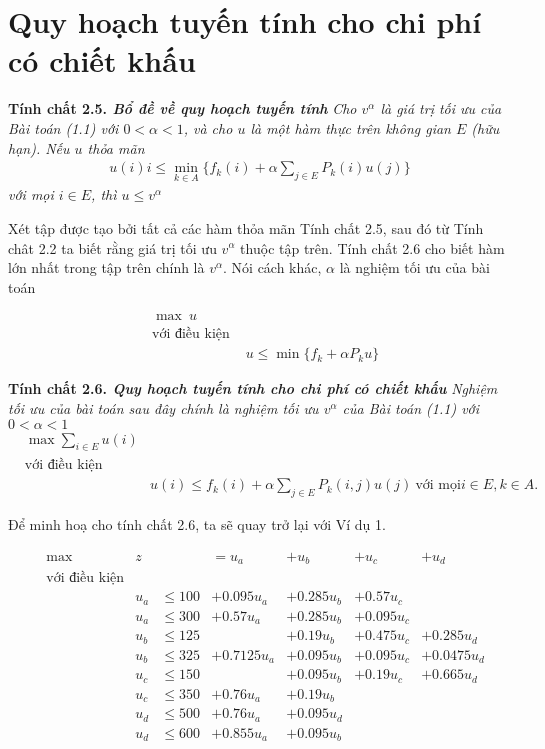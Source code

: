 \documentclass[12pt,a4paper]{report}
\begin{document}
 \section{Quy hoạch tuyến tính cho chi phí có chiết khấu}
   \begin{shaded*}
   	\noindent
   	\textbf{Tính chất 2.5. \textit{Bổ đề về quy hoạch tuyến tính}} \textit{ Cho $v^\alpha$ là giá trị tối ưu của Bài toán (1.1) với $0<\alpha<1$, và cho $u$ là một hàm thực trên không gian $E$ (hữu hạn). Nếu $u$ thỏa mãn
   		\begin{align*}
   		u(i)i \leq \underset{k \in A}{\min}\{f_k(i)+\alpha \sum_{j \in E}P_k(i)u(j)\}
   		\end{align*}
   với mọi $i\in E$, thì $u \leq v^\alpha$	
    } 
   \end{shaded*}
  Xét tập được tạo bởi tất cả các hàm thỏa mãn Tính chất 2.5, sau đó từ Tính chât 2.2 ta biết rằng giá trị tối ưu $v^\alpha$ thuộc tập trên. Tính chất 2.6 cho biết hàm lớn nhất trong tập trên chính là $v^\alpha$. Nói cách khác, $\alpha$ là nghiệm tối ưu của bài toán
  
  \begin{align*}
  &\max \ u\\
  &\text{với điều kiện } \\
  & & u \leq \min\{f_k+\alpha P_k u\}
  \end{align*} 
  \begin{shaded*}
  	\noindent
  	\textbf{Tính chất 2.6. \textit{Quy hoạch tuyến tính cho chi phí có chiết khấu}} \textit{ Nghiệm tối ưu của bài toán sau đây chính là nghiệm tối ưu $v^\alpha$ của Bài toán (1.1) với $0<\alpha<1$
  		\begin{align*}
  		&\max \sum _{i\in E}u(i)\\
  		&\text{với điều kiện } \\
  		& &u(i)\leq f_k(i)+\alpha \sum_{j \in E}P_k(i,j)u(j) \ \text{với mọi} i \in E, k \in A.  
  		\end{align*}
  	} 
  
  \end{shaded*}
  
  \medskip
  Để minh hoạ cho tính chất 2.6, ta sẽ quay trở lại với Ví dụ 1.
  
  \begin{align*}
  &\max & z&&=u_a&+u_b&+u_c&+u_d\\
  &\text{với điều kiện}\\
  && u_a &\leq 100&+0.095u_a&+0.285u_b&+0.57u_c\\
  && u_a &\leq 300&+0.57u_a&+0.285u_b&+0.095u_c&\\
  &&u_b&\leq 125&              &+0.19u_b&+0.475u_c&+0.285u_d\\
  &&u_b&\leq 325&+0.7125u_a&+0.095u_b&+0.095u_c&+0.0475u_d \\
  &&u_c &\leq 150&&+0.095u_b&+0.19u_c&+0.665u_d\\
  &&u_c&\leq 350&+0.76u_a&+0.19u_b \\
  &&u_d&\leq 500&+0.76u_a&+0.095u_d\\
  &&u_d&\leq 600&+0.855u_a&+0.095u_b
  \end{align*}
   
\end{document}
